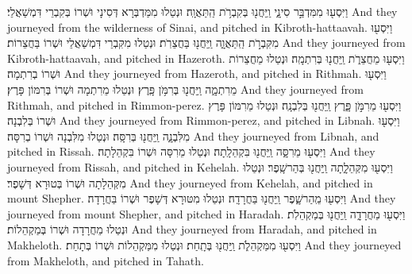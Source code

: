 {וַיִּסְע֖וּ מִמִּדְבַּ֣ר סִינָ֑י וַֽיַּחֲנ֖וּ בְּקִבְרֹ֥ת הַֽתַּאֲוָֽה׃}
{וּנְטַלוּ מִמַּדְבְּרָא דְּסִינָי וּשְׁרוֹ בְּקִבְרֵי דִּמְשַׁאֲלֵי׃}
{And they journeyed from the wilderness of Sinai, and pitched in Kibroth-hattaavah.}{}
{וַיִּסְע֖וּ מִקִּבְרֹ֣ת הַֽתַּאֲוָ֑ה וַֽיַּחֲנ֖וּ בַּחֲצֵרֹֽת׃}
{וּנְטַלוּ מִקִּבְרֵי דִּמְשַׁאֲלֵי וּשְׁרוֹ בַּחֲצֵרוֹת׃}
{And they journeyed from Kibroth-hattaavah, and pitched in Hazeroth.}{}
{וַיִּסְע֖וּ מֵחֲצֵרֹ֑ת וַֽיַּחֲנ֖וּ בְּרִתְמָֽה׃}
{וּנְטַלוּ מֵחֲצֵרוֹת וּשְׁרוֹ בְרִתְמָה׃}
{And they journeyed from Hazeroth, and pitched in Rithmah.}{}
{וַיִּסְע֖וּ מֵרִתְמָ֑ה וַֽיַּחֲנ֖וּ בְּרִמֹּ֥ן פָּֽרֶץ׃}
{וּנְטַלוּ מֵרִתְמָה וּשְׁרוֹ בְּרִמּוֹן פָּרֶץ׃}
{And they journeyed from Rithmah, and pitched in Rimmon-perez.}{}
{וַיִּסְע֖וּ מֵרִמֹּ֣ן פָּ֑רֶץ וַֽיַּחֲנ֖וּ בְּלִבְנָֽה׃}
{וּנְטַלוּ מֵרִמּוֹן פָּרֶץ וּשְׁרוֹ בְּלִבְנָה׃}
{And they journeyed from Rimmon-perez, and pitched in Libnah.}{}
{וַיִּסְע֖וּ מִלִּבְנָ֑ה וַֽיַּחֲנ֖וּ בְּרִסָּֽה׃}
{וּנְטַלוּ מִלִּבְנָה וּשְׁרוֹ בְרִסָּה׃}
{And they journeyed from Libnah, and pitched in Rissah.}{}
{וַיִּסְע֖וּ מֵרִסָּ֑ה וַֽיַּחֲנ֖וּ בִּקְהֵלָֽתָה׃}
{וּנְטַלוּ מֵרִסָּה וּשְׁרוֹ בִּקְהֵלָתָה׃}
{And they journeyed from Rissah, and pitched in Kehelah.}{}
{וַיִּסְע֖וּ מִקְּהֵלָ֑תָה וַֽיַּחֲנ֖וּ בְּהַר\maqqaf שָֽׁפֶר׃}
{וּנְטַלוּ מִקְּהֵלָתָה וּשְׁרוֹ בְּטוּרָא דְּשָׁפֶר׃}
{And they journeyed from Kehelah, and pitched in mount Shepher.}{}
{וַיִּסְע֖וּ מֵֽהַר\maqqaf שָׁ֑פֶר וַֽיַּחֲנ֖וּ בַּחֲרָדָֽה׃}
{וּנְטַלוּ מִטּוּרָא דְּשָׁפֶר וּשְׁרוֹ בַּחֲרָדָה׃}
{And they journeyed from mount Shepher, and pitched in Haradah.}{}
{וַיִּסְע֖וּ מֵחֲרָדָ֑ה וַֽיַּחֲנ֖וּ בְּמַקְהֵלֹֽת׃}
{וּנְטַלוּ מֵחֲרָדָה וּשְׁרוֹ בְּמַקְהֵלוֹת׃}
{And they journeyed from Haradah, and pitched in Makheloth.}{}
{וַיִּסְע֖וּ מִמַּקְהֵלֹ֑ת וַֽיַּחֲנ֖וּ בְּתָֽחַת׃}
{וּנְטַלוּ מִמַּקְהֵלוֹת וּשְׁרוֹ בְּתָחַת׃}
{And they journeyed from Makheloth, and pitched in Tahath.}{}

